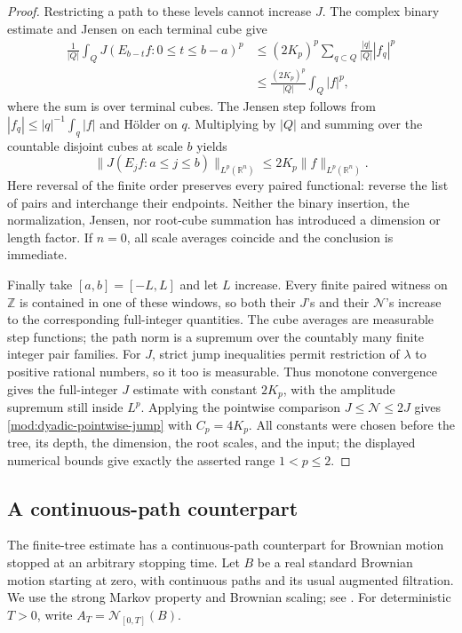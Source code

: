 \documentclass[11pt]{article}
\numberwithin{equation}{section}
\theoremstyle{remark}
\theoremstyle{definition}
\begin{document}
\begin{proof}
Restricting a path to these levels cannot increase $J$.
The complex binary estimate and Jensen on each terminal cube give
\[
 \begin{split}
 \frac1{|Q|}\int_Q J(E_{b-t}f:0\le t\le b-a)^p
 &\le (2K_p)^p\sum_{q\subset Q}\frac{|q|}{|Q|}|f_q|^p\\
 &\le\frac{(2K_p)^p}{|Q|}\int_Q|f|^p,
 \end{split}
\]
where the sum is over terminal cubes. The Jensen step follows
from $|f_q|\le |q|^{-1}\int_q|f|$ and H\"older on $q$.
Multiplying by $|Q|$ and summing over the countable disjoint cubes
at scale $b$ yields
\[
 \|J(E_jf:a\le j\le b)\|_{L^p(\mathbb R^n)}
 \le2K_p\|f\|_{L^p(\mathbb R^n)}.
\]
Here reversal of the finite order preserves every paired functional:
reverse the list of pairs and interchange their endpoints.
Neither the binary insertion, the normalization, Jensen, nor
root-cube summation has introduced a dimension or length factor.
If $n=0$, all scale averages coincide and the conclusion is immediate.

Finally take $[a,b]=[-L,L]$ and let $L$ increase. Every finite
paired witness on $\mathbb Z$ is contained in one of these windows,
so both their $J$'s and their $\mathcal N$'s increase to the
corresponding full-integer quantities. The cube averages are
measurable step functions; the path norm is a supremum over the
countably many finite integer pair families. For $J$, strict jump
inequalities permit restriction of $\lambda$ to positive rational
numbers, so it too is measurable. Thus monotone convergence gives
the full-integer $J$ estimate with constant $2K_p$, with the
amplitude supremum still inside $L^p$. Applying the pointwise
comparison $J\le\mathcal N\le2J$ gives
\eqref{mod:dyadic-pointwise-jump} with $C_p=4K_p$.
All constants were chosen before the tree, its depth, the dimension,
the root scales, and the input; the displayed numerical bounds give
exactly the asserted range $1<p\le2$.
\end{proof}


\subsection{A continuous-path counterpart}

The finite-tree estimate has a continuous-path counterpart for Brownian
motion stopped at an arbitrary stopping time. Let $B$ be a real standard
Brownian motion starting at zero, with continuous paths and its usual
augmented filtration. We use the strong Markov property and Brownian
scaling; see \cite{RevuzYor}. For deterministic $T>0$, write
$A_T=\mathcal N_{[0,T]}(B)$.
\end{document}
